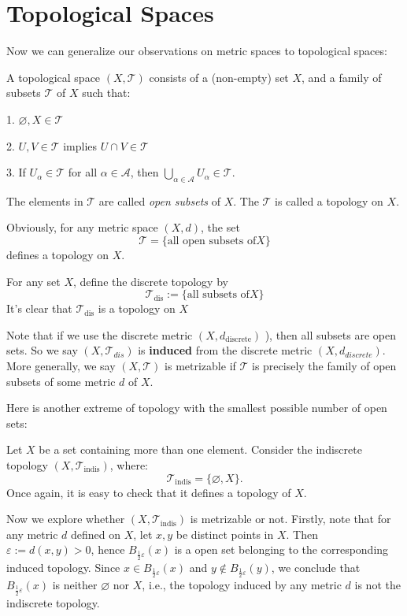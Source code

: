 
\chapter{Topological Spaces}
Now we can generalize our observations on metric spaces to topological spaces:
\begin{definition} A topological space $(X, \mathcal{T})$ consists of a (non-empty) set \(X\), and a family of subsets $\mathcal{T}$ of \(X\) such that:

1. \(\varnothing,X \in  \mathcal{T}\)

2. \(U,V \in  \mathcal{T}\) implies \(U \cap  V \in  \mathcal{T}\)

3. If \({U}_{\alpha} \in  \mathcal{T}\) for all \(\alpha  \in  \mathcal{A}\), then \(\mathop{\bigcup}\limits_{{\alpha  \in  \mathcal{A}}}{U}_{\alpha} \in  \mathcal{T}\).

The elements in \(\mathcal{T}\) are called \emph{open subsets} of \(X\). The \(\mathcal{T}\) is called a topology on \(X\).
\end{definition}

Obviously, for any metric space $(X,d)$, the set
\[
\mathcal{T} = \{ \text{all open subsets of}X\}
\]
defines a topology on \(X\).

\begin{definition} 
For any set $X$, define the discrete topology by
\[
{\mathcal{T}}_{\text{dis}} := \{ \text{all subsets of}X\}
\]
It’s clear that \({\mathcal{T}}_{\text{dis}}\) is a topology on \(X\)
\end{definition}
Note that if we use the discrete metric \(\left({X,{d}_{\text{discrete}}}\right)\) ), then all subsets are open sets. So we say 
$(X, \mathcal{T}_{dis})$ is {\bf induced} from the discrete metric $(X, d_{discrete})$. More generally, we say $(X,\mathcal{T})$ is metrizable if \(\mathcal{T}\) is precisely the family of open subsets of some metric $d$ of $X$.

Here is another extreme of topology with the smallest possible number of open sets:
\begin{example}
Let \(X\) be a set containing more than one element. Consider the indiscrete topology \(\left({X,{\mathcal{T}}_{\text{indis}}}\right)\), where:
\[
{\mathcal{T}}_{\text{indis}} = \{ \varnothing,X\} \text{.}
\]
Once again, it is easy to check that it defines a topology of $X$. 

Now we explore whether \(\left({X,{\mathcal{T}}_{\text{indis}}}\right)\) is metrizable or not. Firstly, note that for any metric \(d\) defined on \(X\), let \(x,y\) be distinct points in \(X\). Then \(\varepsilon  := d\left({x,y}\right)  > 0\), hence \({B}_{\frac{1}{2}\varepsilon}\left(x\right)\) is a open set belonging to the corresponding induced topology. Since \(x \in  {B}_{\frac{1}{2}\varepsilon}\left(x\right)\) and \(y \notin  {B}_{\frac{1}{2}\varepsilon}\left(y\right)\), we conclude that \({B}_{\frac{1}{2}\varepsilon}\left(x\right)\) is neither \(\varnothing\) nor \(X\), i.e., the topology induced by any metric \(d\) is not the indiscrete topology.
\end{example}

